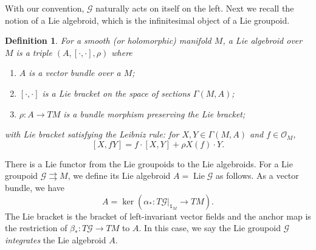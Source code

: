 \documentclass{amsart}
\newtheorem{definition}[theorem]{Definition}
\numberwithin{equation}{section}
\newcommand{\cG}{\mathcal{G}}
\newcommand{\cO}{\mathcal{O}}
\newcommand{\Lie}{\operatorname{Lie}}
\newcommand{\rra}{\rightrightarrows}
\begin{document}
With our convention, $\cG$ naturally acts on itself on the left.
Next we recall the notion of a Lie algebroid, which is the infinitesimal object of a Lie groupoid.
\begin{definition} \label{def:algeroid}
  For a smooth (or holomorphic) manifold $M$, a Lie algebroid over $M$ is a triple $(A, [\cdot, \cdot], \rho)$ where
  \begin{enumerate}
    \item $A$ is a vector bundle over a $M$;
    \item $[\cdot, \cdot]$ is a Lie bracket on the space of sections $\Gamma(M, A)$;
    \item $\rho: A \to TM$ is a bundle morphism preserving the Lie bracket;
  \end{enumerate}
  with Lie bracket satisfying the Leibniz rule: for $X, Y \in \Gamma(M, A)$ and $f \in \cO_M$,
  \[[X, fY] = f\cdot[X, Y] + \rho X(f) \cdot Y.\]
\end{definition}

There is a Lie functor from the Lie groupoids to the Lie algebroids.
For a Lie groupoid $\cG \rra M$, we define its Lie algebroid $A = \Lie \cG$ as follows.
As a vector bundle, we have
\begin{equation} \label{eq:Liefunctor}
	A = \ker \left(\alpha_*: T\cG|_{\mathtt{1}_M} \to TM \right).
\end{equation}
The Lie bracket is the bracket of left-invariant vector fields and the anchor map is the restriction of $\beta_*: T\cG \to TM$ to $A$.
In this case, we say the Lie groupoid $\cG$ \emph{integrates} the Lie algebroid $A$.
\end{document}
